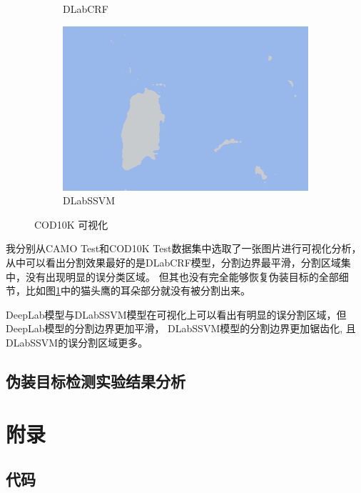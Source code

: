 \documentclass[a4paper,12pt]{ctexart}
\begin{document}
\begin{figure}[h!]
\begin{subfigure}{0.25\textwidth}
        \caption{DLabCRF}
    \end{subfigure}%
    \hfill
    \begin{subfigure}{0.25\textwidth}
        \centering
        \includegraphics[width=\linewidth]{figures/COD10K_demo1/COD10K_demo1_pred_dlap.png}
        \caption{DLabSSVM}
    \end{subfigure}
    
    \caption{COD10K 可视化 \label{fig:COD10K_demo1}}
\end{figure}

我分别从CAMO Test和COD10K Test数据集中选取了一张图片进行可视化分析，从中可以看出分割效果最好的是DLabCRF模型，分割边界最平滑，分割区域集中，没有出现明显的误分类区域。
但其也没有完全能够恢复伪装目标的全部细节，比如图\ref{fig:COD10K_demo1}中的猫头鹰的耳朵部分就没有被分割出来。

DeepLab模型与DLabSSVM模型在可视化上可以看出有明显的误分割区域，但DeepLab模型的分割边界更加平滑，
DLabSSVM模型的分割边界更加锯齿化, 且DLabSSVM的误分割区域更多。


\subsection{伪装目标检测实验结果分析}



\section{附录}
\subsection{代码}




\end{document}
